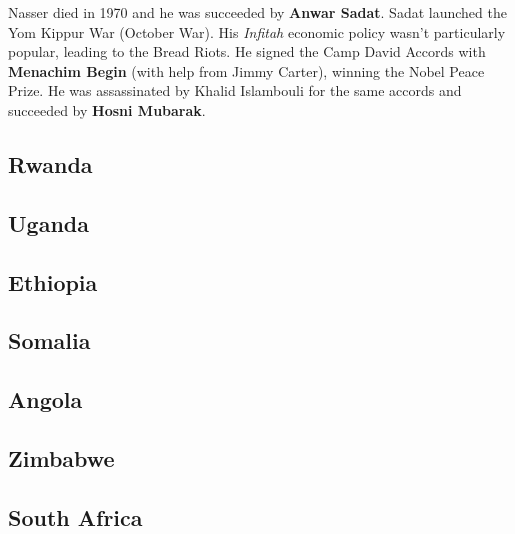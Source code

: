 Nasser died in 1970 and he was succeeded by \textbf{Anwar Sadat}.
Sadat launched the Yom Kippur War (October War).
His \textit{Infitah} economic policy wasn't particularly popular, leading to the Bread Riots.
He signed the Camp David Accords with \textbf{Menachim Begin} (with help from Jimmy Carter),
winning the Nobel Peace Prize.
He was assassinated by Khalid Islambouli for the same accords and succeeded by \textbf{Hosni Mubarak}.

\subsection*{Rwanda}

\subsection*{Uganda}

\subsection*{Ethiopia}

\subsection*{Somalia}

\subsection*{Angola}

\subsection*{Zimbabwe}

\subsection*{South Africa}
